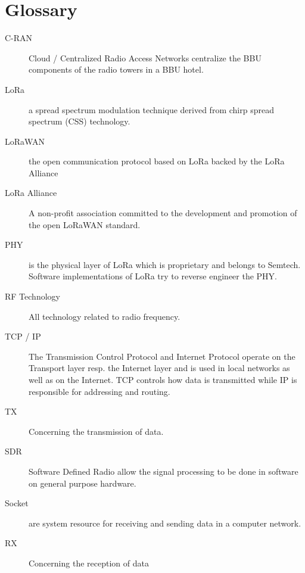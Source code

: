 \chapter*{Glossary}


\begin{description}
  \item[C-RAN] Cloud / Centralized Radio Access Networks centralize the BBU components of the radio towers in a BBU hotel.
  \item[LoRa] a spread spectrum modulation technique derived from chirp spread spectrum (CSS) technology.
  \item[LoRaWAN] the open communication protocol based on LoRa backed by the LoRa Alliance 
  \item[LoRa Alliance] A non-profit association committed to the development and promotion of the open LoRaWAN standard.
  \item[PHY] is the physical layer of LoRa which is proprietary and belongs to Semtech. Software implementations of LoRa try to reverse engineer the PHY.
  \item[RF Technology] All technology related to radio frequency.
  \item[TCP / IP] The Transmission Control Protocol and Internet Protocol operate on the Transport layer resp. the Internet layer and is used in local networks as well as on the Internet.
  TCP controls how data is transmitted while IP is responsible for addressing and routing. 
  \item[TX] Concerning the transmission of data.
  \item[SDR] Software Defined Radio allow the signal processing to be done in software on general purpose hardware.
  \item[Socket] are system resource for receiving and sending data in a computer network.
  \item[RX] Concerning the reception of data   
\end{description}
